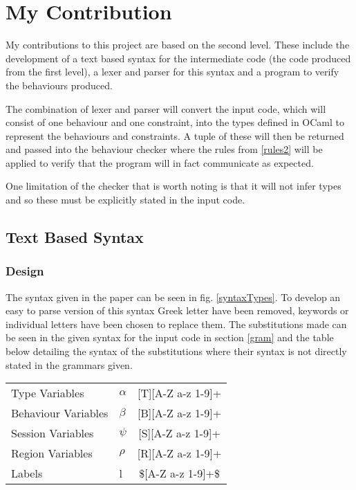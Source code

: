 \chapter{My Contribution}

My contributions to this project are based on the second level. These include the development of a text based syntax for the intermediate code (the code produced from the first level), a lexer and parser for this syntax and a program to verify the behaviours produced. 

The combination of lexer and parser will convert the input code, which will consist of one behaviour and one constraint, into the types defined in OCaml to represent the behaviours and constraints. A tuple of these will then be returned and passed into the behaviour checker where the rules from \ref{rules2} will be applied to verify that the program will in fact communicate as expected. 

One limitation of the checker that is worth noting is that it will not infer types and so these must be explicitly stated in the input code. 

\section{Text Based Syntax} \label{text}

\subsection {Design} 
The syntax given in the paper can be seen in fig. \ref{syntaxTypes}. To develop an easy to parse version of this syntax Greek letter have been removed, keywords or individual letters have been chosen to replace them. The substitutions made can be seen in the given syntax for the input code in section \ref{gram} and the table below detailing the syntax of the substitutions where their syntax is not directly stated in the grammars given.

\begin{tabular}{l l c }
Type Variables & $\alpha$ & [T][A-Z a-z 1-9]+ \\
Behaviour Variables &$\beta$ & [B][A-Z a-z 1-9]+ \\
Session Variables & $\psi$ & [S][A-Z a-z 1-9]+ \\
Region Variables & $\rho$ & [R][A-Z a-z 1-9]+ \\
Labels & l & \$[A-Z a-z 1-9]+\$ \\
\end{tabular}

